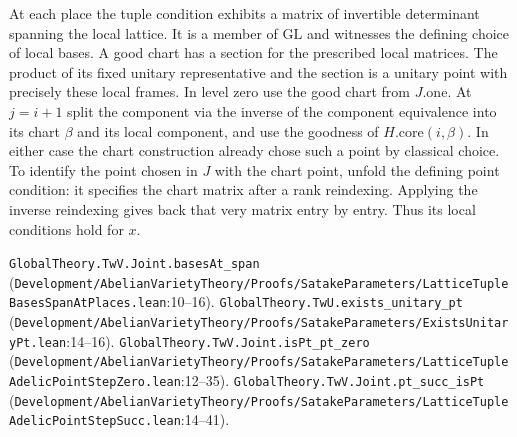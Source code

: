 At each place the tuple condition exhibits a matrix of invertible determinant spanning the local lattice. It is a member of $\mathrm{GL}$ and witnesses the defining choice of local bases. A good chart has a section for the prescribed local matrices. The product of its fixed unitary representative and the section is a unitary point with precisely these local frames. In level zero use the good chart from $J.\mathrm{one}$. At $j=i+1$ split the component via the inverse of the component equivalence into its chart $\beta$ and its local component, and use the goodness of $H.\mathrm{core}(i,\beta)$. In either case the chart construction already chose such a point by classical choice. To identify the point chosen in $J$ with the chart point, unfold the defining point condition: it specifies the chart matrix after a rank reindexing. Applying the inverse reindexing gives back that very matrix entry by entry. Thus its local conditions hold for $x$.
\par{\footnotesize \nolinkurl{GlobalTheory.TwV.Joint.basesAt_span} (\nolinkurl{Development/AbelianVarietyTheory/Proofs/SatakeParameters/LatticeTupleBasesSpanAtPlaces.lean}\allowbreak:10--16). \nolinkurl{GlobalTheory.TwU.exists_unitary_pt} (\nolinkurl{Development/AbelianVarietyTheory/Proofs/SatakeParameters/ExistsUnitaryPt.lean}\allowbreak:14--16). \nolinkurl{GlobalTheory.TwV.Joint.isPt_pt_zero} (\nolinkurl{Development/AbelianVarietyTheory/Proofs/SatakeParameters/LatticeTupleAdelicPointStepZero.lean}\allowbreak:12--35). \nolinkurl{GlobalTheory.TwV.Joint.pt_succ_isPt} (\nolinkurl{Development/AbelianVarietyTheory/Proofs/SatakeParameters/LatticeTupleAdelicPointStepSucc.lean}\allowbreak:14--41).\par}

